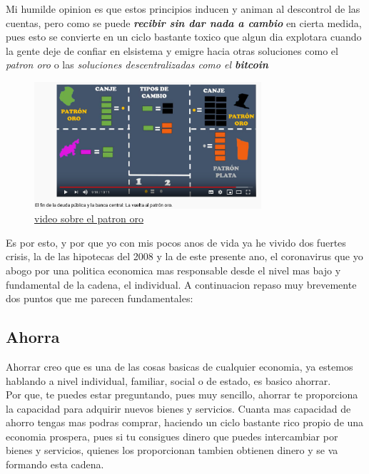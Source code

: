 Mi humilde opinion es que estos principios inducen y animan al descontrol de las cuentas, pero como se puede \textbf{\textit{recibir sin dar nada a cambio}} en cierta medida, pues esto se convierte en un ciclo bastante toxico que algun dia explotara cuando la gente deje de confiar en elsistema y emigre hacia otras soluciones como el \textit{patron oro}  o las \textit{soluciones descentralizadas como el \textbf{bitcoin}\cite{nakamoto2019bitcoin}} \\
		\begin{figure}[H]
			\centering
			\includegraphics[width=0.75\textwidth]{figures/patron_oro.png}
			\caption{\href{https://www.youtube.com/watch?v=dFA7_wjIq_c}{video sobre el patron oro}}
		\end{figure}

Es por esto, y por que yo con mis pocos anos de vida ya he vivido dos fuertes crisis, la de las hipotecas del 2008 \cite{montalvo2009financiacion} y la de este presente ano, el coronavirus \cite{khafaie2020cross} que yo abogo por una politica economica mas responsable desde el nivel mas bajo y fundamental de la cadena, el individual. A continuacion repaso muy brevemente dos puntos que me parecen fundamentales:

\subsection{Ahorra}

Ahorrar creo que es una de las cosas basicas de cualquier economia, ya estemos hablando a nivel individual, familiar, social o de estado, es basico ahorrar.\\

Por que, te puedes estar preguntando, pues muy sencillo, ahorrar te proporciona la capacidad para adquirir nuevos bienes y servicios. Cuanta mas capacidad de ahorro tengas mas podras comprar, haciendo un ciclo bastante rico propio de una economia prospera, pues si tu consigues dinero que puedes intercambiar por bienes y servicios, quienes los proporcionan tambien obtienen dinero y se va formando esta cadena.\\

